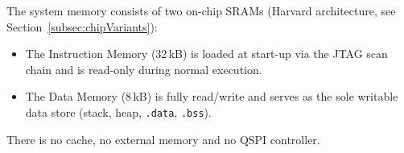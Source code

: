 The system memory consists of two on-chip SRAMs (Harvard architecture,
see Section~\ref{subsec:chipVariants}):
\begin{itemize}
  \item The Instruction Memory (32\,kB) is loaded at start-up via the JTAG scan
    chain and is read-only during normal execution.
  \item The Data Memory (8\,kB) is fully read/write and serves as the sole
    writable data store (stack, heap, \texttt{.data}, \texttt{.bss}).
\end{itemize}
There is no cache, no external memory and no QSPI controller.
